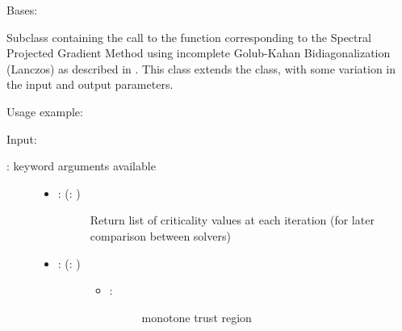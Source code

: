 \documentclass[a4paper,10pt,english]{sphinxmanual}
\begin{document}
\begin{fulllineitems}
\label{\detokenize{skprocrustes:skprocrustes.GKBSolver}}
Bases: 

Subclass containing the call to the  function 
corresponding to the Spectral Projected Gradient Method using 
incomplete Golub-Kahan Bidiagonalization (Lanczos) as described in 
{\hyperref[\detokenize{index:bibliography}]{}}. This class extends the  class,
with some variation in the input and output parameters.

Usage example:

\begin{sphinxVerbatim}[commandchars=\\\{\}]
  
  
\end{sphinxVerbatim}

Input:
\begin{description}
\item[{: keyword arguments available}] \leavevmode\begin{itemize}
\item {} \begin{description}
\item[{: (: )}] \leavevmode
Return list of criticality values at each iteration (for later
comparison between solvers)

\end{description}

\item {} \begin{description}
\item[{: (: )}] \leavevmode\begin{itemize}
\item {} \begin{description}
\item[{: }] \leavevmode
monotone trust region


\end{description}
\end{itemize}
\end{description}
\end{itemize}
\end{description}
\end{fulllineitems}
\end{document}
